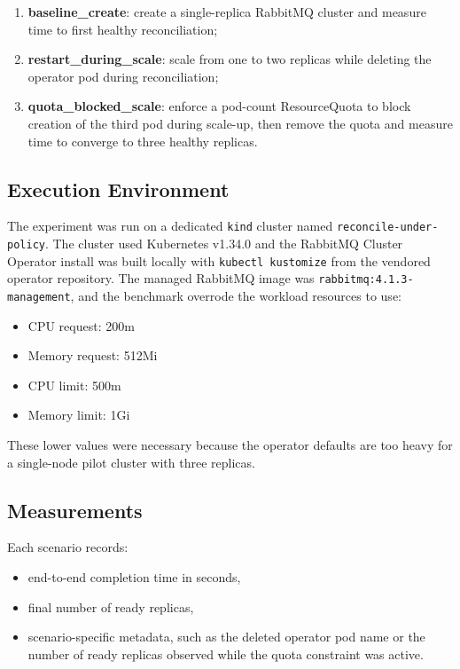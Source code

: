 \documentclass[11pt,a4paper]{article}
\begin{document}
\begin{enumerate}
  \item \textbf{baseline\_create}: create a single-replica RabbitMQ cluster and
  measure time to first healthy reconciliation;
  \item \textbf{restart\_during\_scale}: scale from one to two replicas while
  deleting the operator pod during reconciliation;
  \item \textbf{quota\_blocked\_scale}: enforce a pod-count ResourceQuota to
  block creation of the third pod during scale-up, then remove the quota and
  measure time to converge to three healthy replicas.
\end{enumerate}

\subsection{Execution Environment}

The experiment was run on a dedicated \texttt{kind} cluster named
\texttt{reconcile-under-policy}. The cluster used Kubernetes v1.34.0 and the
RabbitMQ Cluster Operator install was built locally with
\texttt{kubectl kustomize} from the vendored operator repository. The managed
RabbitMQ image was \texttt{rabbitmq:4.1.3-management}, and the benchmark
overrode the workload resources to use:

\begin{itemize}
  \item CPU request: 200m
  \item Memory request: 512Mi
  \item CPU limit: 500m
  \item Memory limit: 1Gi
\end{itemize}

These lower values were necessary because the operator defaults are too heavy
for a single-node pilot cluster with three replicas.

\subsection{Measurements}

Each scenario records:

\begin{itemize}
  \item end-to-end completion time in seconds,
  \item final number of ready replicas,
  \item scenario-specific metadata, such as the deleted operator pod name or
  the number of ready replicas observed while the quota constraint was active.
\end{itemize}
\end{document}

